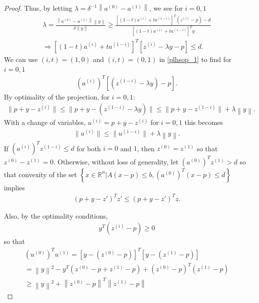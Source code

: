\documentclass{article}
\theoremstyle{case}
\numberwithin{theorem}{subsection}
\newcommand{\Rn}{\mathbb R^n}
\begin{document}
\begin{proof}
Thus, by letting $\lambda = \delta^{-1}\left\|a^{(0)} - a^{(1)}\right\|$, we see for $i=0,1$
\begin{align}
\lambda
= \frac{\left\|a^{(0)} - a^{(1)}\right\|\left\|y\right\|}{\delta \|y\|}
\ge \frac{\left[(1 - t) a^{(i)} + t a^{(1-i)}\right]^T\left(z^{(i)} - p\right) - d}{\left[(1 - t) a^{(i)} + t a^{(1-i)}\right]^Ty}  \\
\Longrightarrow \left[(1 - t) a^{(i)} + t a^{(1-i)}\right]^T \left[z^{(i)} - \lambda y - p\right] \le d \label{plhsop_1}.
\end{align}
We can use $(i,t)=(1, 0)$ and $(i,t)=(0, 1)$ in \cref{plhsop_1} to find for $i=0, 1$
\begin{align*}
\left(a^{(i)}\right)^T\left[\left(z^{(1-i)} - \lambda y\right) - p\right].
\end{align*}
By optimality of the projection, for $i=0,1$:
\begin{align}
\label{plhsop_eqn1}
\|p + y - z^{(i)}\| \le \|p + y - \left(z^{(1-i)} - \lambda y\right)\| \le \|p + y - z^{(1-i)}\| +  \lambda\left\|y\right\|.
\end{align}
With a change of variables, $u^{(i)} = p + y - z^{(i)}$ for $i=0,1$ this becomes
\begin{align*}
\|u^{(i)}\| \le \|u^{(1-i)}\| + \lambda\left\|y\right\|.
\end{align*}
If $\left(a^{(i)}\right)^T z^{(1-i)} \le d$ for both $i=0$ and $1$, then $z^{(0)} = z^{(1)}$ so that $z^{(0)} - z^{(1)} = 0$.
Otherwise, without loss of generality, let $\left(a^{(0)}\right)^T z^{(1)} > d$ so that
convexity of the set $\left\{x \in \Rn | A(x - p) \le b, \left(a^{(0)}\right)^T (x-p) \le d\right\}$ implies
\begin{align}
\label{plhsop_eqn2}
(p + y - z')^T z' \le (p + y - z')^Tz.
\end{align}




Also, by the optimality conditions,
\begin{align*}
y^T\left(z^{(i)} - p\right) \ge 0
\end{align*}
so that
\begin{align*}
\left(u^{(0)}\right)^Tu^{(1)} = \left[y - \left(z^{(0)} - p\right)\right]^T\left[y - \left(z^{(1)} - p\right)\right] \\
= \left\|y\right\|^2 - y^T\left(z^{(0)} - p + z^{(1)} - p\right) + \left(z^{(0)} - p\right)^T\left(z^{(1)} - p\right) \\
\ge \left\|y\right\|^2 + \left\|z^{(0)} - p\right\|^T\left\|z^{(1)} - p\right\|
\end{align*}



\end{proof}
\end{document}
